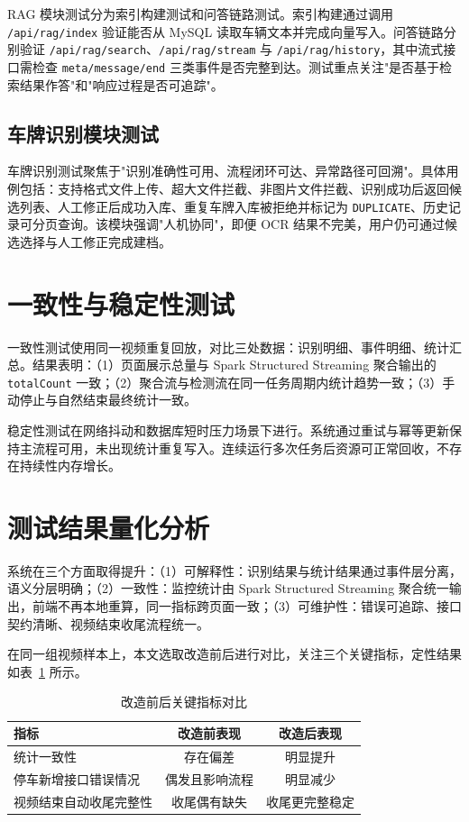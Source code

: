 \documentclass{wzuthesis} %
\begin{document}
RAG 模块测试分为索引构建测试和问答链路测试。索引构建通过调用 \nolinkurl{/api/rag/index} 验证能否从 MySQL 读取车辆文本并完成向量写入。问答链路分别验证 \nolinkurl{/api/rag/search}、\nolinkurl{/api/rag/stream} 与 \nolinkurl{/api/rag/history}，其中流式接口需检查 \texttt{meta/message/end} 三类事件是否完整到达。测试重点关注"是否基于检索结果作答"和"响应过程是否可追踪"。

\subsection{车牌识别模块测试}

车牌识别测试聚焦于"识别准确性可用、流程闭环可达、异常路径可回溯"。具体用例包括：支持格式文件上传、超大文件拦截、非图片文件拦截、识别成功后返回候选列表、人工修正后成功入库、重复车牌入库被拒绝并标记为 \texttt{DUPLICATE}、历史记录可分页查询。该模块强调"人机协同"，即便 OCR 结果不完美，用户仍可通过候选选择与人工修正完成建档。

\section{一致性与稳定性测试}

一致性测试使用同一视频重复回放，对比三处数据：识别明细、事件明细、统计汇总。结果表明：（1）页面展示总量与 Spark Structured Streaming 聚合输出的 \texttt{totalCount} 一致；（2）聚合流与检测流在同一任务周期内统计趋势一致；（3）手动停止与自然结束最终统计一致。

稳定性测试在网络抖动和数据库短时压力场景下进行。系统通过重试与幂等更新保持主流程可用，未出现统计重复写入。连续运行多次任务后资源可正常回收，不存在持续性内存增长。

\section{测试结果量化分析}

系统在三个方面取得提升：（1）可解释性：识别结果与统计结果通过事件层分离，语义分层明确；（2）一致性：监控统计由 Spark Structured Streaming 聚合统一输出，前端不再本地重算，同一指标跨页面一致；（3）可维护性：错误可追踪、接口契约清晰、视频结束收尾流程统一。

在同一组视频样本上，本文选取改造前后进行对比，关注三个关键指标，定性结果如表~\ref{tab:quant-result} 所示。

\begin{table}[H]
\centering
\caption{改造前后关键指标对比}
\label{tab:quant-result}
\begin{tabular}{|p{4.5cm}|c|c|}
\hline
指标 & 改造前表现 & 改造后表现 \\
\hline
统计一致性 & 存在偏差 & 明显提升 \\
\hline
停车新增接口错误情况 & 偶发且影响流程 & 明显减少 \\
\hline
视频结束自动收尾完整性 & 收尾偶有缺失 & 收尾更完整稳定 \\
\hline
\end{tabular}
\end{table}
\end{document}
